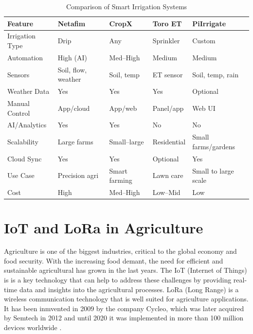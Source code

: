 \begin{table}[ht]
\centering
\begin{tabular}{|p{3.2cm}|p{3.2cm}|p{3.2cm}|p{3.2cm}|p{3.2cm}|}
\hline
\textbf{Feature} & \textbf{Netafim} & \textbf{CropX} & \textbf{Toro ET} & \textbf{PiIrrigate} \\
\hline
Irrigation Type & Drip & Any & Sprinkler & Custom \\
\hline
Automation & High (AI) & Med–High & Medium & Medium \\
\hline
Sensors & Soil, flow, weather & Soil, temp & ET sensor & Soil, temp, rain \\
\hline
Weather Data & Yes & Yes & Yes & Optional \\
\hline
Manual Control & App/cloud & App/web & Panel/app & Web UI \\
\hline
AI/Analytics & Yes & Yes & No & No \\
\hline
Scalability & Large farms & Small–large & Residential & Small farms/gardens \\
\hline
Cloud Sync & Yes & Yes & Optional & Yes \\
\hline
Use Case & Precision agri & Smart farming & Lawn care & Small to large scale\\
\hline
Cost & High & Med–High & Low–Mid & Low \\
\hline
\end{tabular}
\caption{Comparison of Smart Irrigation Systems}
\label{tab:irrigation_comparison}
\end{table}

\section{IoT and LoRa in Agriculture}
Agriculture is one of the biggest industries, critical to the global economy and food security. With the increasing food 
demant, the need for efficient and sustainable agricultural has grown in the last years. The IoT (Internet of Things) is
is a key technology that can help to address these challenges by providing real-time data and 
insights into the agricultural processes. LoRa (Long Range) is a wireless communication technology 
that is well suited for agriculture applications. It has been inmvented in 2009  by the company Cycleo, 
which was later acquired by Semtech in 2012 and until 2020 it was implemented in more than 100 million devices worldwide
\cite{LoRaHistory}.

